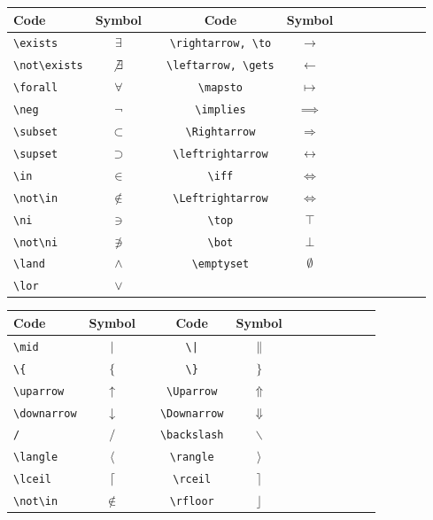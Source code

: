 \documentclass{article}
\begin{document}
\vspace{5mm}

\begin{tabular}{l*{10}{c}r}
	Code & Symbol & \vline & Code & Symbol \\
	\hline
	\verb|\exists| & $\exists$ & \vline & \verb|\rightarrow, \to| & $\to$ \\
	\verb|\not\exists| & $\not\exists$ & \vline & \verb|\leftarrow, \gets| & $\gets$ \\
	\verb|\forall| & $\forall$ & \vline & \verb|\mapsto| & $\mapsto$ \\
	\verb|\neg| & $\neg$ & \vline & \verb|\implies| & $\implies$ \\
	\verb|\subset| & $\subset$ & \vline & \verb|\Rightarrow| & $\Rightarrow$ \\
	\verb|\supset| & $\supset$ & \vline & \verb|\leftrightarrow| & $\leftrightarrow$ \\
	\verb|\in| & $\in$ & \vline & \verb|\iff| & $\iff$ \\
	\verb|\not\in| & $\not\in$ & \vline & \verb|\Leftrightarrow| & $\Leftrightarrow$ \\
	\verb|\ni| & $\ni$ & \vline & \verb|\top| & $\top$ \\
	\verb|\not\ni| & $\not\ni$ & \vline & \verb|\bot| & $\bot$ \\
	\verb|\land| & $\land$ & \vline & \verb|\emptyset| & $\emptyset$ \\
	\verb|\lor| & $\lor$ & \vline &  & 
\end{tabular}

\vspace{5mm}

\begin{tabular}{l*{10}{c}r}
	Code & Symbol & \vline & Code & Symbol \\
	\hline
	\verb|\mid| & $\mid$ & \vline & \verb=\|= & $\|$ \\
	\verb|\{| & $\{$ & \vline & \verb|\}| & $\}$ \\
	\verb|\uparrow| & $\uparrow$ & \vline & \verb|\Uparrow| & $\Uparrow$ \\
	\verb|\downarrow| & $\downarrow$ & \vline & \verb|\Downarrow| & $\Downarrow$ \\
	\verb|/| & $/$ & \vline & \verb|\backslash| & $\backslash$ \\
	\verb|\langle| & $\langle$ & \vline & \verb|\rangle| & $\rangle$ \\
	\verb|\lceil| & $\lceil	$ & \vline & \verb|\rceil| & $\rceil$ \\
	\verb|\not\in| & $\not\in$ & \vline & \verb|\rfloor| & $\rfloor$
\end{tabular}
\end{document}
